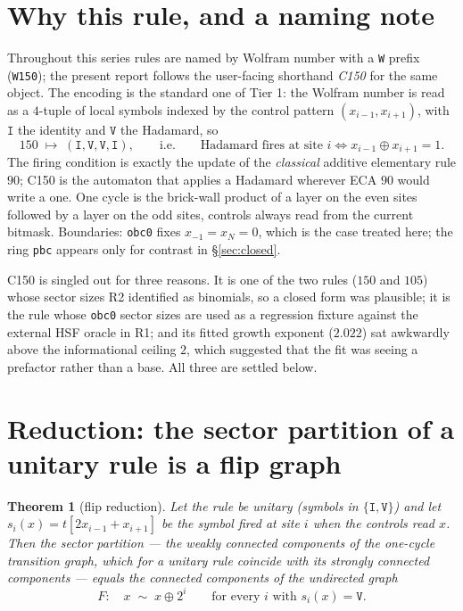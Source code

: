 \documentclass[11pt]{article}
\newcommand{\rt}[1]{\texttt{#1}}
\theoremstyle{plain}
\newtheorem{theorem}{Theorem}
\theoremstyle{definition}
\begin{document}
\tableofcontents

\section{Why this rule, and a naming note}

Throughout this series rules are named by Wolfram number with a \rt{W} prefix
(\rt{W150}); the present report follows the user-facing shorthand \emph{C150} for
the same object. The encoding is the standard one of Tier 1: the Wolfram number
is read as a $4$-tuple of local symbols indexed by the control pattern
$(x_{i-1},x_{i+1})$, with $\rt{I}$ the identity and $\rt{V}$ the Hadamard, so
\begin{equation}
  150 \;\longmapsto\; (\rt{I},\rt{V},\rt{V},\rt{I}),
  \qquad\text{i.e.}\qquad
  \text{Hadamard fires at site } i \iff x_{i-1}\oplus x_{i+1} = 1 .
  \label{eq:rule}
\end{equation}
The firing condition is exactly the update of the \emph{classical} additive
elementary rule $90$; C150 is the automaton that applies a Hadamard wherever ECA
$90$ would write a one. One cycle is the brick-wall product of a layer on the
even sites followed by a layer on the odd sites, controls always read from the
current bitmask. Boundaries: \rt{obc0} fixes $x_{-1}=x_N=0$, which is the case
treated here; the ring \rt{pbc} appears only for contrast in
\S\ref{sec:closed}.

C150 is singled out for three reasons. It is one of the two rules
($150$ and $105$) whose sector sizes R2 identified as binomials, so a closed form
was plausible; it is the rule whose \rt{obc0} sector sizes are used as a
regression fixture against the external HSF oracle in R1; and its fitted growth
exponent ($2.022$) sat awkwardly above the informational ceiling $2$, which
suggested that the fit was seeing a prefactor rather than a base. All three are
settled below.

\section{Reduction: the sector partition of a unitary rule is a flip graph}
\label{sec:flip}

\begin{theorem}[flip reduction]\label{thm:flip}
Let the rule be unitary (symbols in $\{\rt{I},\rt{V}\}$) and let
$s_i(x) = t[2x_{i-1}+x_{i+1}]$ be the symbol fired at site $i$ when the controls
read $x$. Then the sector partition --- the weakly connected components of the
one-cycle transition graph, which for a unitary rule coincide with its strongly
connected components --- equals the connected components of the undirected graph
\begin{equation}
  F:\quad x \;\sim\; x \oplus 2^i \qquad\text{for every } i
  \text{ with } s_i(x) = \rt{V}.
  \label{eq:flip}
\end{equation}
\end{theorem}
\end{document}
